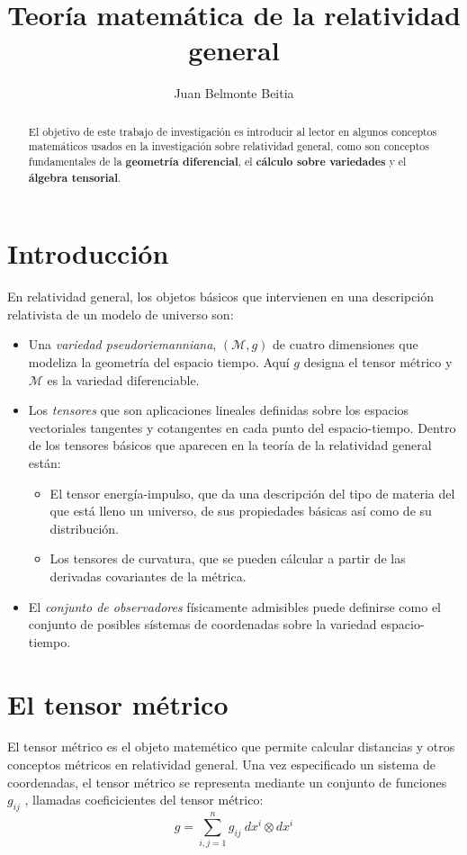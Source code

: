 \documentclass[a4paper,10pt]{article}
\begin{document}
\title{Teoría matemática de la relatividad general}
\author{Juan Belmonte Beitia}
\date{}

\maketitle

\begin{abstract}
El objetivo de este trabajo de investigación es introducir al lector en algunos
conceptos matemáticos usados en la investigación sobre relatividad
general, como son conceptos fundamentales de la \textbf{geometría diferencial},
el \textbf{cálculo sobre variedades} y el \textbf{álgebra tensorial}.
\end{abstract}

\section{Introducción}
En relatividad general, los objetos básicos que intervienen en una descripción
relativista de un modelo de universo son:

\begin{itemize}
\item Una \textit{variedad pseudoriemanniana}, $(\mathcal{M}, g)$ de cuatro dimensiones 
que modeliza la geometría del espacio tiempo. Aquí $g$ designa el tensor métrico y
$\mathcal{M}$ es la variedad diferenciable.

\item Los \textit{tensores} que son aplicaciones lineales definidas sobre los espacios
vectoriales tangentes y cotangentes en cada punto del espacio-tiempo. Dentro
de los tensores básicos que aparecen en la teoría de la relatividad general
están:
\begin{itemize}
\item El tensor energía-impulso, que da una descripción del tipo de materia
del que está lleno un universo, de sus propiedades básicas así como
de su distribución.
\item Los tensores de curvatura, que se pueden cálcular a partir de las
derivadas covariantes de la métrica.
\end{itemize}

\item El \textit{conjunto de observadores} físicamente admisibles puede definirse como
el conjunto de posibles sístemas de coordenadas sobre la variedad espacio-tiempo.
\end{itemize}

\section{El tensor métrico}
El tensor métrico es el objeto matemético que permite calcular distancias
y otros conceptos métricos en relatividad general. Una vez especificado un 
sistema de coordenadas, el tensor métrico se representa mediante un conjunto
de funciones $g_{ij}$ , llamadas coeficicientes del tensor métrico:
\begin{equation}
\label{eq:metric}
g = \sum_{i,j=1}^n g_{ij}\ dx^i\otimes dx^i
\end{equation}
\end{document}
